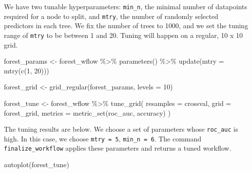 \documentclass[
]{article}
\newenvironment{Shaded}{\begin{snugshade}}{\end{snugshade}}
\newcommand{\AttributeTok}[1]{\textcolor[rgb]{0.77,0.63,0.00}{#1}}
\newcommand{\DecValTok}[1]{\textcolor[rgb]{0.00,0.00,0.81}{#1}}
\newcommand{\FunctionTok}[1]{\textcolor[rgb]{0.00,0.00,0.00}{#1}}
\newcommand{\NormalTok}[1]{#1}
\newcommand{\OtherTok}[1]{\textcolor[rgb]{0.56,0.35,0.01}{#1}}
\newcommand{\SpecialCharTok}[1]{\textcolor[rgb]{0.00,0.00,0.00}{#1}}
\begin{document}
We have two tunable hyperparameters: \texttt{min\_n}, the minimal number
of datapoints required for a node to split, and \texttt{mtry}, the
number of randomly selected predictors in each tree. We fix the number
of trees to 1000, and we set the tuning range of \texttt{mtry} to be
between 1 and 20. Tuning will happen on a regular, 10 x 10 grid.

\begin{Shaded}
\begin{Highlighting}[]
\NormalTok{forest\_params }\OtherTok{\textless{}{-}}
\NormalTok{  forest\_wflow }\SpecialCharTok{\%\textgreater{}\%}
  \FunctionTok{parameters}\NormalTok{() }\SpecialCharTok{\%\textgreater{}\%}
  \FunctionTok{update}\NormalTok{(}\AttributeTok{mtry =} \FunctionTok{mtry}\NormalTok{(}\FunctionTok{c}\NormalTok{(}\DecValTok{1}\NormalTok{, }\DecValTok{20}\NormalTok{)))}

\NormalTok{forest\_grid }\OtherTok{\textless{}{-}}
  \FunctionTok{grid\_regular}\NormalTok{(forest\_params, }\AttributeTok{levels =} \DecValTok{10}\NormalTok{)}
\end{Highlighting}
\end{Shaded}

\begin{Shaded}
\begin{Highlighting}[]
\NormalTok{forest\_tune }\OtherTok{\textless{}{-}}
\NormalTok{  forest\_wflow }\SpecialCharTok{\%\textgreater{}\%}
  \FunctionTok{tune\_grid}\NormalTok{(}
      \AttributeTok{resamples =}\NormalTok{ crossval,}
      \AttributeTok{grid =}\NormalTok{ forest\_grid,}
      \AttributeTok{metrics =} \FunctionTok{metric\_set}\NormalTok{(roc\_auc, accuracy)}
\NormalTok{  )}
\end{Highlighting}
\end{Shaded}

The tuning results are below. We choose a set of parameters whose
\texttt{roc\_auc} is high. In this case, we choose \texttt{mtry\ =\ 5},
\texttt{min\_n\ =\ 6}. The command \texttt{finalize\_workflow} applies
these parameters and returns a tuned workflow.

\begin{Shaded}
\begin{Highlighting}[]
\FunctionTok{autoplot}\NormalTok{(forest\_tune)}
\end{Highlighting}
\end{Shaded}
\end{document}

